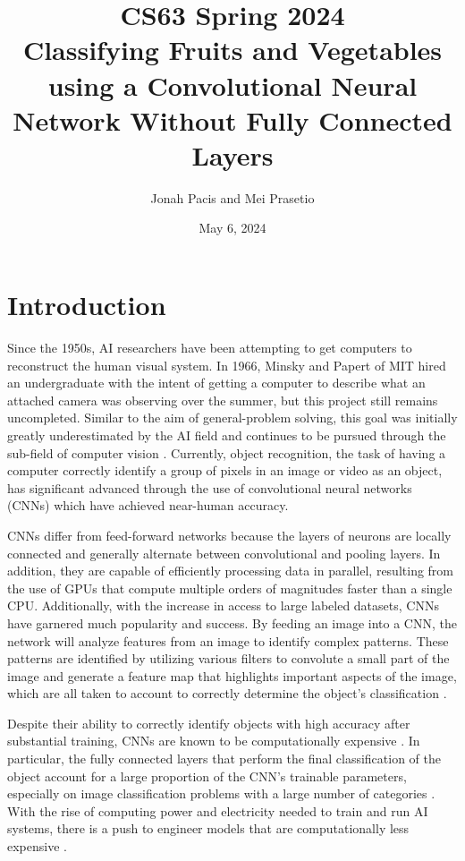 \documentclass[11pt]{article}
\title{CS63 Spring 2024\\Classifying Fruits and Vegetables using a Convolutional Neural Network Without Fully Connected Layers}
\author{Jonah Pacis and Mei Prasetio}
\date{May 6, 2024}
\begin{document}
\maketitle

\section{Introduction}
Since the 1950s, AI researchers have been attempting to get computers to reconstruct the human visual system. In 1966, Minsky and Papert of MIT hired an undergraduate with the intent of getting a computer to describe what an attached camera was observing over the summer, but this project still remains uncompleted\cite{mitchell2019artificial}. Similar to the aim of general-problem solving, this goal was initially greatly underestimated by the AI field and continues to be pursued through the sub-field of computer vision \cite{mitchell2019artificial}. Currently, object recognition, the task of having a computer correctly identify a group of pixels in an image or video as an object, has significant advanced through the use of convolutional neural networks (CNNs) which have achieved near-human accuracy. 

CNNs differ from feed-forward networks because the layers of neurons are locally connected and generally alternate between convolutional and pooling layers. In addition, they are capable of efficiently processing data in parallel, resulting from the use of GPUs that compute multiple orders of magnitudes faster than a single CPU\cite{mitchell2024cs63}. Additionally, with the increase in access to large labeled datasets, CNNs have garnered much popularity and success. By feeding an image into a CNN, the network will analyze features from an image to identify complex patterns. These patterns are identified by utilizing various filters to convolute a small part of the image and generate a feature map that highlights important aspects of the image, which are all taken to account to correctly determine the object's classification \cite{aijaz_objectrecognition}.

Despite their ability to correctly identify objects with high accuracy after substantial training, CNNs are known to be computationally expensive \cite{mitchell2024cs63}. In particular, the fully connected layers that perform the final classification of the object account for a large proportion of the CNN's trainable parameters, especially on image classification problems with a large number of categories \cite{qian2018fullyconnected}. With the rise of computing power and electricity needed to train and run AI systems, there is a push to engineer models that are computationally less expensive \cite{coleman2024climateimpact}.
\end{document}
